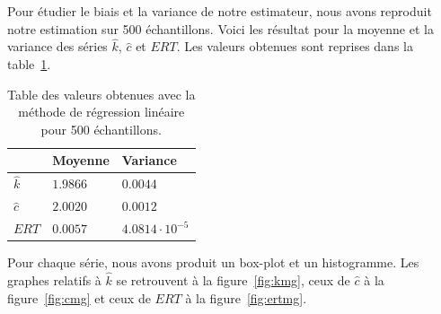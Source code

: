 Pour étudier le biais et la variance de notre estimateur, nous avons reproduit notre estimation sur 500 échantillons. Voici les résultat pour la moyenne et la variance des séries $\hat{k}$, $\hat{c}$ et $ERT$. Les valeurs obtenues sont reprises dans la table~\ref{table:reg1}.

\begin{table}[!ht]
\centering
\begin{tabular}{|l|l|l|}
\hline
				& Moyenne 	& Variance\\
\hline
$\hat{k}$ 	& $1.9866$ 	& $0.0044$\\
$\hat{c}$ 	& $2.0020$ 	& $0.0012$\\
$ERT$		& $0.0057$	& $4.0814\cdot 10^{-5}$\\
\hline
\end{tabular}
\caption{Table des valeurs obtenues avec la méthode de régression linéaire pour 500 échantillons.}
\label{table:reg1}
\end{table}

Pour chaque série, nous avons produit un box-plot et un histogramme. Les graphes relatifs à $\hat{k}$ se retrouvent à la figure~\ref{fig:kmg}, ceux de $\hat{c}$ à la figure~\ref{fig:cmg} et ceux de $ERT$ à la figure~\ref{fig:ertmg}.


